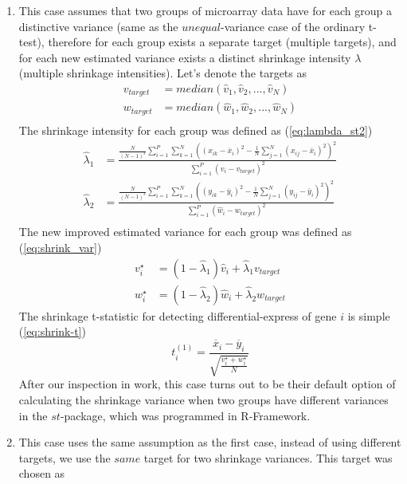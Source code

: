 \begin{enumerate}
	\item This case assumes that two groups of microarray data have for each group a distinctive variance (same as the $unequal$-variance case of the ordinary t-test), therefore for each group exists a separate target (multiple targets), and for each new estimated variance exists a distinct shrinkage intensity $\lambda$ (multiple shrinkage intensities). Let's denote the targets as
		\begin{align*}
			v_{target} &= median(\hat v_1, \hat v_2, ..., \hat v_N) \\
			w_{target} &= median(\hat w_1, \hat w_2, ..., \hat w_N) \\
		\end{align*}
		The shrinkage intensity for each group was defined as (\autoref{eq:lambda_st2})
		\begin{align*}
			\hat \lambda_1 &= \frac{\frac{N}{(N-1)^3}\sum^P_{i=1}\sum^N_{k=1}\left((x_{ik}-\overline{x}_i)^2 - \frac{1}{N}\sum_{j=1}^N(x_{ij}-\overline{x}_i)^2\right)^2}{\sum^P_{i=1}(\hat v_i - v_{target})^2}	 \\
			\hat \lambda_2 &= \frac{\frac{N}{(N-1)^3}\sum^P_{i=1}\sum^N_{k=1}\left((y_{ik}-\overline{y}_i)^2 - \frac{1}{N}\sum_{j=1}^N(y_{ij}-\overline{y}_i)^2\right)^2}{\sum^P_{i=1}(\hat w_i - w_{target})^2}	 \\
		\end{align*}
		The new improved estimated variance for each group was defined as (\autoref{eq:shrink_var})
		\begin{align*}
			v_i^\star &= (1-\hat \lambda_1)\hat v_i + \hat \lambda_1 v_{target} \\
			w_i^\star &= (1-\hat \lambda_2)\hat w_i + \hat \lambda_2 w_{target}
		\end{align*}
		The shrinkage t-statistic for detecting differential-express of gene $i$ is simple (\autoref{eq:shrink-t})
		\begin{equation*}
			t^{(1)}_i = \frac{\overline{x}_i - \overline{y}_i}{\sqrt{ \frac{v^\star_i+w^\star_i}{N} }}
		\end{equation*}
		After our inspection in \cite{OpgenRhein:2007p11} work, this case turns out to be their default option of calculating the shrinkage variance when two groups have different variances in the $st$-package, which was programmed in R-Framework.
	\item This case uses the same assumption as the first case, instead of using different targets, we use the $same$ target for two shrinkage variances. This target was chosen as

\end{enumerate}
